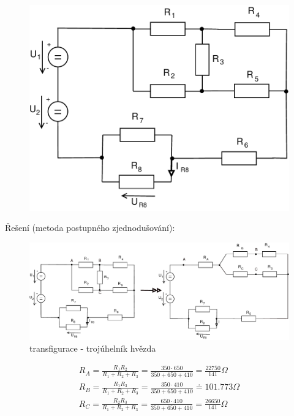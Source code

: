 \documentclass[12pt,a4paper]{article}
\begin{document}
	\begin{figure}[H] 
		\vspace{-1.1cm}
		\center\includegraphics[width=0.6\linewidth]{obr/1_1}
	\end{figure}

	{\Large Řešení (metoda postupného zjednodušování):}\\

	\begin{figure}[H]
		\vspace{-1.1cm}
		\center\includegraphics[width=1.1\linewidth]{obr/1_2}
		\caption*{transfigurace - trojúhelník \textrightarrow \hspace{0.1cm} hvězda}
	\end{figure}
	\begin{gather*}
		R_A = \frac{R_1  R_2}{R_1 + R_2 + R_3} = \frac{350 \cdot 650}{350 + 650 + 410} = \frac{22750}{141} \Omega \\
		R_B = \frac{R_1  R_3}{R_1 + R_2 + R_3} = \frac{350 \cdot 410}{350 + 650 + 410} \doteq 101.773 \Omega \\ 
		R_C = \frac{R_2  R_3}{R_1 + R_2 + R_3} = \frac{650 \cdot 410}{350 + 650 + 410} = \frac{26650}{141} \Omega
	\end{gather*}
\end{document}
